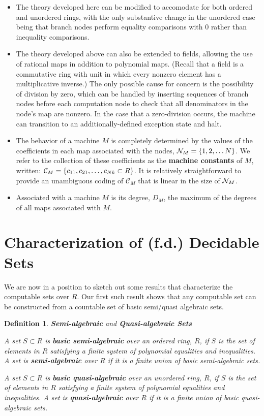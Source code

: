 \documentclass[twoside]{article}
\newtheorem{definition}{Definition}[section]
\begin{document}
\begin{itemize}
\item The theory developed here can be modified to accomodate for both
  ordered and unordered rings, with the only substantive change in the
  unordered case being that branch nodes perform equality comparisons
  with 0 rather than inequality comparisons.

\item The theory developed above can also be extended to fields,
  allowing the use of rational maps in addition to polynomial maps.
  (Recall that a field is a commutative ring with unit in which every
  nonzero element has a multiplicative inverse.)  The only possible
  cause for concern is the possibility of division by zero, which can
  be handled by inserting sequences of branch nodes before each computation
  node to check that all denominators in the node's map are nonzero.
  In the case that a zero-division occurs, the machine can transition
  to an additionally-defined exception state and halt.

\item The behavior of a machine $M$ is completely determined by the
  values of the coefficients in each map associated with the nodes,
  $\mathcal{N}_M = \{1, 2, \ldots N\}$.  We refer to the collection of
  these coefficients as the \textbf{machine constants} of $M$,
  written: $\mathcal{C}_M = \{c_{11}, c_{21}, \ldots, c_{Nk}
    \subset R\}$.  It is relatively straightforward to provide an
  unambiguous coding of $\mathcal{C}_M$ that is linear in the size of
  $\mathcal{N}_M$.

\item Associated with a machine $M$ is its degree, $D_M$, the maximum
  of the degrees of all maps associated with $M$.
\end{itemize}

\section{Characterization of (f.d.) Decidable Sets}

We are now in a position to sketch out some results that characterize
the computable sets over $R$.  Our first such result shows that any
computable set can be constructed from a countable set of basic semi/quasi algebraic sets.

  \begin{definition}{\textbf{Semi-algebraic} and \textbf{Quasi-algebraic Sets}}
    
    A set $S \subset R$ is \textbf{basic semi-algebraic} over an
    ordered ring, $R$, if $S$ is the set of elements in $R$ satisfying
    a finite system of polynomial equalities and inequalities. A set
    is \textbf{semi-algebraic} over $R$ if it is a finite union of basic
    semi-algebraic sets.

    A set $S \subset R$ is \textbf{basic quasi-algebraic} over an
    unordered ring, $R$, if $S$ is the set of elements in $R$ satisfying
    a finite system of polynomial equalities and inequalities. A set
    is \textbf{quasi-algebraic} over $R$ if it is a finite union of basic
    quasi-algebraic sets.
    
  \end{definition}
\end{document}
